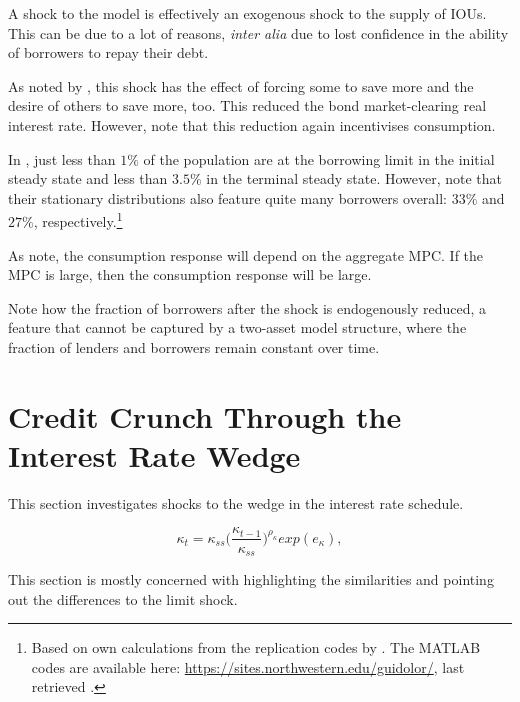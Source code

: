 \documentclass[12pt]{article} %
\numberwithin{equation}{section} %
\begin{document}
A shock to the model is effectively an exogenous shock to the supply of IOUs. This can be due to a lot of reasons, \textit{inter alia} due to lost confidence in the ability of borrowers to repay their debt.

As noted by \textcite{gl2017}, this shock has the effect of forcing some to save more and the desire of others to save more, too. This reduced the bond market-clearing real interest rate. However, note that this reduction again incentivises consumption.

In \textcite{gl2017}, just less than $1\%$ of the population are at the borrowing limit in the initial steady state and less than $3.5\%$ in the terminal steady state. However, note that their stationary distributions also feature quite many borrowers overall: $33\%$ and $27\%$, respectively.\footnote{Based on own calculations from the replication codes by \textcite{gl2017}. The MATLAB codes are available here: \url{https://sites.northwestern.edu/guidolor/}, last retrieved .}

As \textcite{gl2017} note, the consumption response will depend on the aggregate MPC. If the MPC is large, then the consumption response will be large.

Note how the fraction of borrowers after the shock is endogenously reduced, a feature that cannot be captured by a two-asset model structure, where the fraction of lenders and borrowers remain constant over time.

\section{Credit Crunch Through the Interest Rate Wedge}
\label{sec:wedge}

This section investigates shocks to the wedge in the interest rate schedule.

\begin{equation}
    \kappa_t = \kappa_{ss} \Bigg( \frac{\kappa_{t-1}}{\kappa_{ss}} \Bigg)^{\rho_{\kappa}} exp(e_{\kappa}), \label{eq:wedge-process}
\end{equation}

This section is mostly concerned with highlighting the similarities and pointing out the differences to the limit shock.
\end{document}
